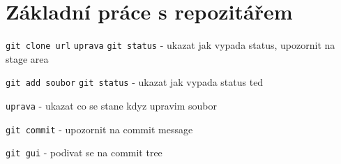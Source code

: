\documentclass[10pt]{article}
\begin{document}
\section{Základní práce s repozitářem}
\texttt{git clone url}
\texttt{uprava}
\texttt{git status}
- ukazat jak vypada status, upozornit na stage area

\texttt{git add soubor}
\texttt{git status}
- ukazat jak vypada status ted

\texttt{uprava}
- ukazat co se stane kdyz upravim soubor

\texttt{git commit}
- upozornit na commit message

\texttt{git gui}
- podivat se na commit tree
\end{document}
